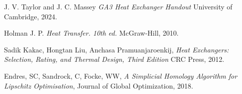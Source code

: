 \documentclass{article}
\begin{document}
\begin{thebibliography}{9}


  J. V. Taylor and J. C. Massey
  \emph{GA3 Heat Exchanger Handout}
  University of Cambridge,
  2024.

  Holman J. P.
  \emph{Heat Transfer. 10th ed.}
  McGraw-Hill,
  2010.

  Sadik Kakac, Hongtan Liu, Anchasa Pramuanjaroenkij,
  \emph{Heat Exchangers: Selection, Rating, and Thermal Design, Third Edition}
  CRC Press,
  2012.

  Endres, SC, Sandrock, C, Focke, WW,
  \emph{A Simplicial Homology Algorithm for Lipschitz Optimisation},
  Journal of Global Optimization,
  2018.

\end{thebibliography}
\end{document}
